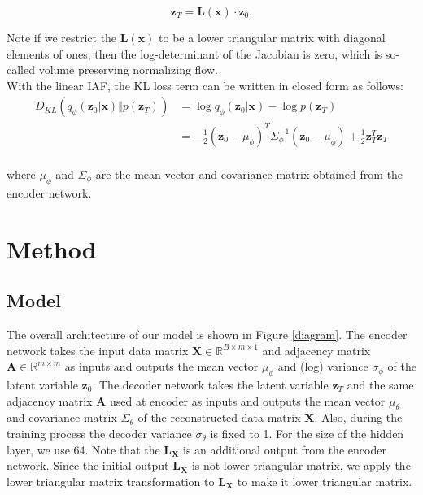 \documentclass[10pt]{article}
\begin{document}
\begin{equation}
    \mathbf{z}_T = \mathbf{L(x)} \cdot \mathbf{z}_0.
\end{equation}

Note if we restrict the $\mathbf{L(x)}$ to be a lower triangular matrix with diagonal elements of ones, then the log-determinant of the Jacobian is zero, which is so-called volume preserving normalizing flow. \cite{kingma2016iaf}\\

With the linear IAF, the KL loss term can be written in closed form as follows:
\begin{equation}
    \begin{aligned}
        D_{KL}(q_\phi(\mathbf{z}_0 | \mathbf{x}) \Vert p(\mathbf{z}_T)) &=
        \log q_\phi(\mathbf{z}_0 | \mathbf{x}) - \log p(\mathbf{z}_T) \\
        &= -\frac{1}{2}(\mathbf{z}_0 -\mu_\phi)^T\Sigma_\phi^{-1}(\mathbf{z}_0 -\mu_\phi) + \frac{1}{2}\mathbf{z}_T^T\mathbf{z}_T \\
    \end{aligned}
\end{equation}

where $\mu_\phi$ and $\Sigma_\phi$ are the mean vector and covariance matrix obtained from the encoder network.\\

\section{Method}

\subsection{Model}

The overall architecture of our model is shown in Figure \ref*{diagram}. The encoder network takes the input data matrix $\mathbf{X}\in \mathbb{R}^{B \times m \times 1}$ and adjacency matrix $\mathbf{A}\in \mathbb{R}^{m \times m}$ as inputs and outputs the mean vector $\mu_\phi$ and (log) variance $\sigma_\phi$ of the latent variable $\mathbf{z}_0$. The decoder network takes the latent variable $\mathbf{z}_T$ and the same adjacency matrix $\mathbf{A}$ used at encoder as inputs and outputs the mean vector $\mu_\theta$ and covariance matrix $\Sigma_\theta$ of the reconstructed data matrix $\mathbf{X}$. Also, during the training process the decoder variance $\sigma_\theta$ is fixed to 1. For the size of the hidden layer, we use 64. Note that the $\mathbf{L_X}$ is an additional output from the encoder network. Since the initial output $\mathbf{L_X}$ is not lower triangular matrix, we apply the lower triangular matrix transformation to $\mathbf{L_X}$ to make it lower triangular matrix.
\end{document}
